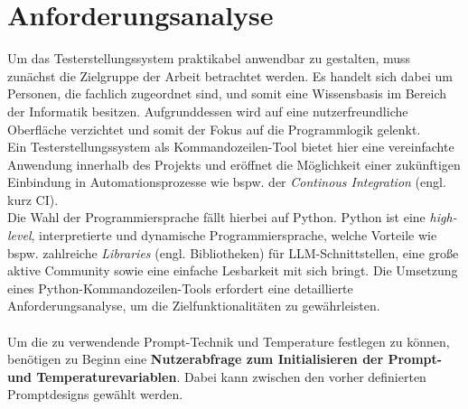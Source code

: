 \section{Anforderungsanalyse}
Um das Testerstellungssystem praktikabel anwendbar zu gestalten, muss zunächst die Zielgruppe der Arbeit betrachtet werden. Es handelt sich dabei um Personen, die fachlich zugeordnet sind, und somit eine Wissensbasis im Bereich der Informatik besitzen. Aufgrunddessen wird auf eine nutzerfreundliche Oberfläche verzichtet und somit der Fokus auf die Programmlogik gelenkt.\\ Ein Testerstellungssystem als Kommandozeilen-Tool bietet hier eine vereinfachte Anwendung innerhalb des Projekts und eröffnet die Möglichkeit einer zukünftigen Einbindung in Automationsprozesse wie bspw. der \textit{Continous Integration} (engl. kurz CI).\\ Die Wahl der Programmiersprache fällt hierbei auf Python. Python ist eine \textit{high-level}, interpretierte und dynamische Programmiersprache, welche Vorteile wie bspw. zahlreiche \textit{Libraries} (engl. Bibliotheken) für LLM-Schnittstellen, eine große aktive Community sowie eine einfache Lesbarkeit mit sich bringt. Die Umsetzung eines Python-Kommandozeilen-Tools erfordert eine detaillierte Anforderungsanalyse, um die Zielfunktionalitäten zu gewährleisten. \cite*{PythonLanguageAdvantages2017}\\\\
Um die zu verwendende Prompt-Technik und Temperature festlegen zu können, benötigen zu Beginn eine \textbf{Nutzerabfrage zum Initialisieren der Prompt- und Temperaturevariablen}. Dabei kann zwischen den vorher definierten Promptdesigns gewählt werden.